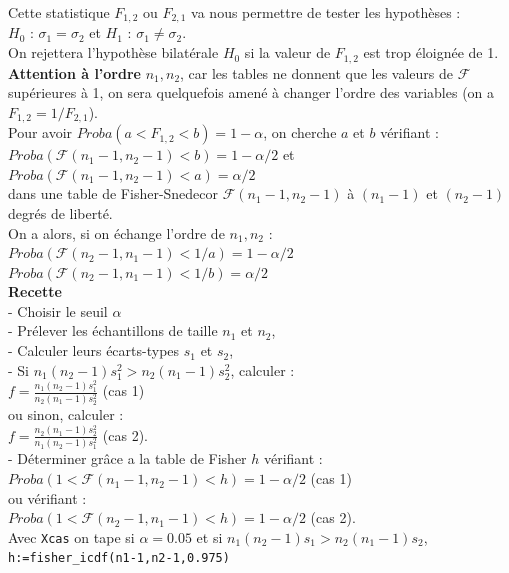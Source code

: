 \documentclass[a4paper,11pt]{book}
\begin{document}
Cette statistique $F_{1,2}$ ou $F_{2,1}$ va nous permettre de tester les 
hypoth\`eses :\\ 
$H_0$ : $\sigma_1=\sigma_2$ et $H_1$ : $\sigma_1 \neq \sigma_2$.\\
On rejettera l'hypoth\`ese bilat\'erale  $H_0$ si la valeur de $F_{1,2}$ 
est trop \'eloign\'ee de 1.\\
{\bf Attention \`a l'ordre} $n_1,n_2$,  car les tables ne donnent que les 
valeurs de $\mathcal F$ sup\'erieures \`a 1, on sera quelquefois amen\'e \`a 
changer l'ordre des variables (on a $F_{1,2}= 1/F_{2,1}$).\\ 
Pour avoir $Proba(a<F_{1,2}<b)=1-\alpha$, on cherche $a$ et $b$ v\'erifiant :\\
$Proba(\mathcal F(n_1-1,n_2-1)<b)=1-\alpha/2$ et \\
$Proba(\mathcal F(n_1-1,n_2-1)<a)=\alpha/2$\\
dans une table de Fisher-Snedecor $\mathcal F(n_1-1,n_2-1)$ \`a $(n_1-1)$ et  
$(n_2-1)$ degr\'es de libert\'e.\\
On a alors, si on \'echange  l'ordre de $n_1,n_2$ :\\
$Proba(\mathcal F(n_2-1,n_1-1)<1/a)=1-\alpha/2$\\
$Proba(\mathcal F(n_2-1,n_1-1)<1/b)=\alpha/2$\\
{\bf Recette}\\
- Choisir le seuil $\alpha$\\
- Pr\'elever les \'echantillons de taille $n_1$ et $n_2$,\\
- Calculer leurs \'ecarts-types $s_1$ et $s_2$,\\
- Si $n_1(n_2-1)s_1^2>n_2(n_1-1)s_2^2$, calculer :\\
$\displaystyle f=\frac{n_1(n_2-1)s_1^2}{n_2(n_1-1)s_2^2}$ (cas 1)\\
 ou sinon, calculer :\\
$\displaystyle f=\frac{n_2(n_1-1)s_2^2}{n_1(n_2-1)s_1^2}$ (cas 2).\\
- D\'eterminer gr\^ace a la table de Fisher $h$ v\'erifiant :\\
$Proba(1<\mathcal F(n_1-1,n_2-1)<h)=1-\alpha/2$ (cas 1) \\
ou v\'erifiant :\\ 
$Proba(1<\mathcal F(n_2-1,n_1-1)<h)=1-\alpha/2$ (cas 2).\\
Avec {\tt Xcas} on tape si $\alpha=0.05$ et
si $n_1(n_2-1)s_1>n_2(n_1-1)s_2$, \\
{\tt h:=fisher\_icdf(n1-1,n2-1,0.975)} \\
\end{document}
